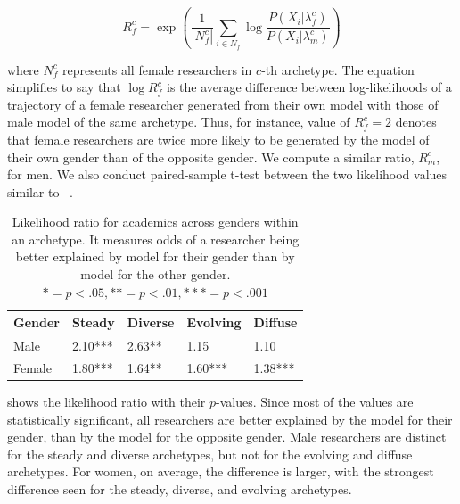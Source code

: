 \begin{equation}
    R^c_f = \exp \left ( \frac{1}{|N^c_f|} {\sum_{i \in {N_f}} \log \frac{ P(X_i | \lambda_f^c)}  {P(X_i | \lambda_m^c)}} \right )
    \label{eq:confusion metric}
\end{equation}

where $N^c_f$ represents all female researchers in $c$-th archetype. The equation simplifies to say that $\displaystyle \log R^c_f$ is the average difference between log-likelihoods of a trajectory of a female researcher generated from their own model with those of male model of the same archetype. Thus, for instance, value of $\displaystyle R^c_f = 2$ denotes that female researchers are twice more likely to be generated by the model of their own gender than of the opposite gender. We compute a similar ratio, $R^c_m$, for men. We also conduct paired-sample t-test \cite{goulden:1949} between the two likelihood values similar to ~.

\begin{table}[tbh]
    \centering
    \begin{tabular}{lllll}
        \toprule %
        Gender & Steady & Diverse & Evolving & {Diffuse} \\
        \midrule
        Male   & 2.10***  & 2.63**  & 1.15  & 1.10   \\
        Female & 1.80***  & 1.64**  & 1.60***  & 1.38***    \\
        \bottomrule
    \end{tabular}
    \caption{
    \label{tab:genderclusterdata} Likelihood ratio for academics across genders within an archetype. It measures odds of a researcher being better explained by model for their gender than by model for the other gender.\\ $* = p < .05, ** = p< .01, *{*}* = p < .001$}
\end{table}

 shows the likelihood ratio with their $p$-values. Since most of the values are statistically significant, all researchers are better explained by the model for their gender, than by the model for the opposite gender. Male researchers are distinct for the steady and diverse archetypes, but not for the evolving and diffuse archetypes. For women, on average, the difference is larger, with the strongest difference seen for the steady, diverse, and evolving archetypes.

